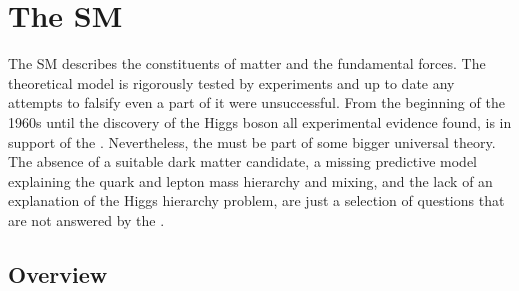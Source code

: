 
\section{The \acl*{SM}}
\label{sec:cpv_theory:standard_model}

The \acf{SM} describes the constituents of matter and the fundamental forces.
The theoretical model is rigorously tested by experiments and up to date any
attempts to falsify even a part of it were unsuccessful. From the beginning of
the 1960s until the discovery of the Higgs boson \cite{Aad:2015zhl} all
experimental evidence found, is in support of the \SM. Nevertheless, the \SM
must be part of some bigger universal theory. The absence of a suitable dark
matter candidate, a missing predictive model explaining the quark and lepton
mass hierarchy and mixing, and the lack of an explanation of the Higgs hierarchy
problem, are just a selection of questions that are not answered by the \SM.

\subsection{Overview}
\label{sec:cpv_theory:standard_model:overview}


